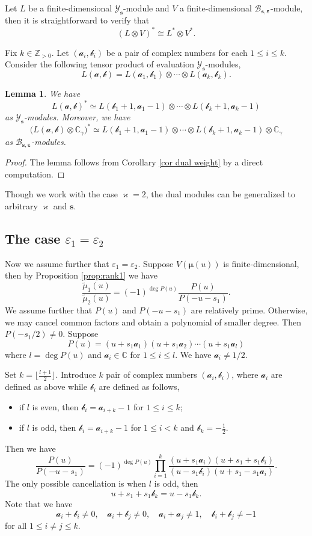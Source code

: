\documentclass[11pt,reqno]{amsart}
\numberwithin{equation}{section}
\newtheorem{lem}[thm]{Lemma}
\theoremstyle{definition}
\theoremstyle{remark}
\newcommand{\beq}{\begin{equation}}
\newcommand{\eeq}{\end{equation}}
\newcommand{\C}{\mathbb{C}}
\newcommand{\mc}{\mathcal}
\newcommand{\bZ}{\mathbb{Z}}
\newcommand{\tl}{\tilde}
\newcommand{\lle}{\leqslant}
\newcommand{\YMN}{{\mathscr{Y}_{\bm s}}}
\newcommand{\BMN}{{\mathscr{B}_{\bm s,\bm \ve}}}
\newcommand{\ka}{\varkappa}
\newcommand{\ve}{\varepsilon}
\newcommand{\s}{{\bm s}}
\begin{document}
Let $L$ be a finite-dimensional $\YMN$-module and $V$ a finite-dimensional $\BMN$-module, then it is straightforward to verify that
\[
(L\otimes V)^*\cong L^*\otimes V^*.
\]

Fix $k\in\bZ_{>0}$. Let $(\mc a_i,\mc b_i)$ be a pair of complex numbers for each $1\lle i\lle k$. Consider the following tensor product of evaluation $\YMN$-modules,
\[
L(\bm{\mc a,\mc b})=L(\mc a_1,\mc b_1)\otimes \cdots\otimes L(\mc a_k,\mc b_k).
\]
\begin{lem}\label{lem:dual}
We have
\[
L(\bm{\mc a,\mc b})^*\simeq L(\mc b_1+1,\mc a_1-1)\otimes \cdots\otimes L(\mc b_k+1,\mc a_k-1)
\]
as $\YMN$-modules. Moreover, we have
\[
\big(L(\bm{\mc a,\mc b})\otimes \C_{\gamma}\big)^*\simeq L(\mc b_1+1,\mc a_1-1)\otimes \cdots\otimes L(\mc b_k+1,\mc a_k-1)\otimes \C_{\gamma}
\]
as $\BMN$-modules.
\end{lem}
\begin{proof}
The lemma follows from Corollary \ref{cor dual weight} by a direct computation.
\end{proof}

Though we work with the case $\ka=2$, the dual modules can be generalized to arbitrary $\ka$ and $\s$.

\subsection{The case $\ve_1=\ve_2$}
Now we assume further that $\ve_1=\ve_2$. Suppose $V(\bm\mu(u))$ is finite-dimensional, then by Proposition \ref{prop:rank1} we have
\beq\label{P-def}
\frac{\tl \mu_1(u)}{\tl \mu_2(u)}=(-1)^{\deg P(u)}\frac{P(u)}{P(-u-s_1)}.
\eeq
We assume further that $P(u)$ and $P(-u-s_1)$ are relatively prime. Otherwise, we may cancel common factors and obtain a polynomial of smaller degree. Then $P(-s_1/2)\ne 0$. Suppose
\[
P(u)=(u+s_1\mc a_1)(u+s_1\mc a_2)\cdots (u+s_1\mc a_{l})
\]
where $l=\deg P(u)$ and $\mc a_i\in\C$ for $1\lle i\lle l$. We have $\mc a_i\ne 1/2$.

Set $k=\lfloor\frac{l+1}{2} \rfloor$. Introduce $k$ pair of complex numbers $(\mc a_i,\mc b_i)$, where $\mc a_i$ are defined as above while $\mc b_i$ are defined as follows,
\begin{itemize}
    \item if $l$ is even, then $\mc b_i=\mc a_{i+k}-1$ for $1\lle i\lle k$;
    \item if $l$ is odd, then $\mc b_i=\mc a_{i+k}-1$ for $1\lle i< k$ and $\mc b_k=-\frac{1}{2}$.
\end{itemize}
Then we have
\beq\label{P-factor}
\frac{P(u)}{P(-u-s_1)}=(-1)^{\deg P(u)}\prod_{i=1}^k\frac{(u+s_1\mc a_i)(u+s_1+s_1\mc b_i)}{(u-s_1\mc b_i)(u+s_1-s_1\mc a_i)}.
\eeq
The only possible cancellation is when $l$ is odd, then
\[
u+s_1+s_1\mc b_k=u-s_1\mc b_k.
\]
Note that we have
\beq\label{notequalto}
\mc a_i+\mc b_i\ne 0,\quad \mc a_i+\mc b_j\ne 0, \quad \mc a_i+\mc a_j\ne 1,\quad \mc b_i+\mc b_j\ne -1
\eeq
for all $1\lle i\ne j\lle k$.
\end{document}
